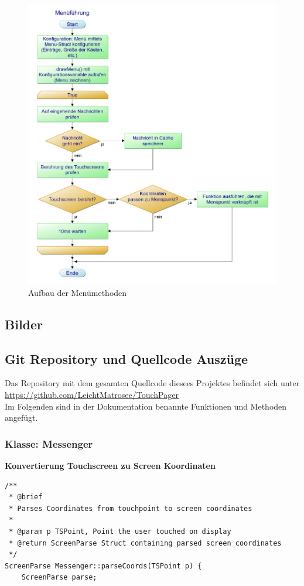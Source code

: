 \documentclass[a4paper, 11pt]{scrartcl}
\begin{document}
\begin{small}
\begin{figure}[H]
    \begin{center}
        \includegraphics[scale=0.35]{Bilder/Menüführung.png}
        \caption{Aufbau der Menümethoden}\label{diag:menu_pap}
    \end{center}
\end{figure}



\subsection{Bilder}


\newpage
\subsection{Git Repository und Quellcode Auszüge}\label{ch:codeschnipsel}
Das Repository mit dem gesamten Quellcode diesees Projektes befindet sich unter
\\
\url{https://github.com/LeichtMatrosee/TouchPager}
\\
Im Folgenden sind in der Dokumentation benannte Funktionen und Methoden angefügt.

\subsubsection{Klasse: Messenger}
\textbf{Konvertierung Touchscreen zu Screen Koordinaten}\label{code:screenparse}
\begin{lstlisting}
/**
 * @brief 
 * Parses Coordinates from touchpoint to screen coordinates
 * 
 * @param p TSPoint, Point the user touched on display
 * @return ScreenParse Struct containing parsed screen coordinates
 */
ScreenParse Messenger::parseCoords(TSPoint p) {
    ScreenParse parse;
    

\end{lstlisting}
\end{small}
\end{document}

